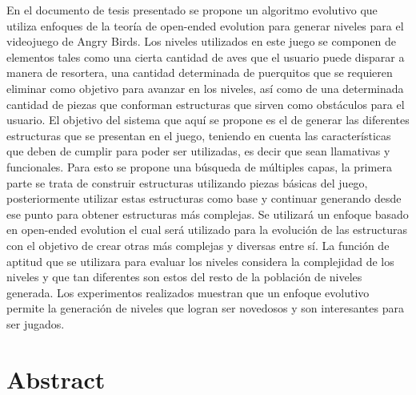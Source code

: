 % 
% 
%

En el documento de tesis presentado se propone un algoritmo evolutivo que
utiliza enfoques de la teoría de open-ended evolution para generar niveles para
el videojuego de Angry Birds. Los niveles utilizados en este juego se componen
de elementos tales como una cierta cantidad de aves que el usuario puede
disparar a manera de resortera, una cantidad determinada de puerquitos que se
requieren eliminar como objetivo para avanzar en los niveles, así como de una
determinada cantidad de piezas que conforman estructuras que sirven como
obstáculos para el usuario. El objetivo del sistema que aquí se propone es el de
generar las diferentes estructuras que se presentan en el juego, teniendo en
cuenta las características que deben de cumplir para poder ser utilizadas, es
decir que sean llamativas y funcionales. Para esto se propone una búsqueda de
múltiples capas, la primera parte se trata de construir estructuras utilizando
piezas básicas del juego, posteriormente utilizar estas estructuras como base y
continuar generando desde ese punto para obtener estructuras más complejas. Se
utilizará un enfoque basado en open-ended evolution el cual será utilizado para
la evolución de las estructuras con el objetivo de crear otras más complejas y
diversas entre sí. La función de aptitud que se utilizara para evaluar los
niveles considera la complejidad de los niveles y que tan diferentes son estos
del resto de la población de niveles generada. Los experimentos realizados
muestran que un enfoque evolutivo permite la generación de niveles que logran
ser novedosos y son interesantes para ser jugados.

\clearpage
\section*{Abstract}

